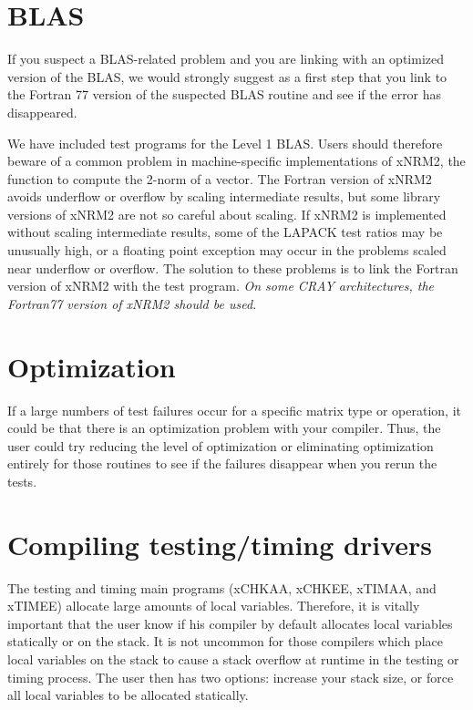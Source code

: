 \section{BLAS}

If you suspect a BLAS-related problem and you are linking
with an optimized version of the BLAS, we would strongly suggest
as a first step that you link to the Fortran 77 version of
the suspected BLAS routine and see if the error has disappeared.

We have included test programs for the Level 1 BLAS.
Users should therefore beware of a common problem in machine-specific
implementations of xNRM2,
the function to compute the 2-norm of a vector.
The Fortran version of xNRM2 avoids underflow or overflow
by scaling intermediate results, but some library versions of xNRM2
are not so careful about scaling.
If xNRM2 is implemented without scaling intermediate results, some of
the LAPACK test ratios may be unusually high, or
a floating point exception may occur in the problems scaled near
underflow or overflow.
The solution to these problems is to link the Fortran version of
xNRM2 with the test program.  {\em On some CRAY architectures, the Fortran77
version of xNRM2 should be used.}

\section{Optimization}

If a large numbers of test failures occur for a specific matrix type
or operation, it could be that there is an optimization problem with
your compiler.  Thus, the user could try reducing the level of
optimization or eliminating optimization entirely for those routines
to see if the failures disappear when you rerun the tests.


\section{Compiling testing/timing drivers}

The testing and timing main programs (xCHKAA, xCHKEE, xTIMAA, and
xTIMEE)
allocate large amounts of local variables.  Therefore, it is vitally
important that the user know if his compiler by default allocates local
variables statically or on the stack.  It is not uncommon for those
compilers which place local variables on the stack to cause a stack
overflow at runtime in the testing or timing process.  The user then
has two options:  increase your stack size, or force all local variables
to be allocated statically.

